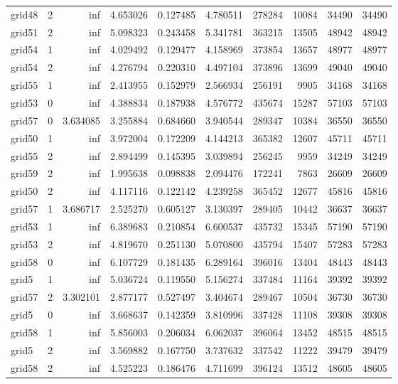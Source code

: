 \begin{longtable}{|l|r|r|r|r|r|r|r|r|r|}
grid48 & 2 & inf & 4.653026 & 0.127485 & 4.780511 & 278284 & 10084 & 34490 & 34490 \\
grid51 & 2 & inf & 5.098323 & 0.243458 & 5.341781 & 363215 & 13505 & 48942 & 48942 \\
grid54 & 1 & inf & 4.029492 & 0.129477 & 4.158969 & 373854 & 13657 & 48977 & 48977 \\
grid54 & 2 & inf & 4.276794 & 0.220310 & 4.497104 & 373896 & 13699 & 49040 & 49040 \\
grid55 & 1 & inf & 2.413955 & 0.152979 & 2.566934 & 256191 & 9905 & 34168 & 34168 \\
grid53 & 0 & inf & 4.388834 & 0.187938 & 4.576772 & 435674 & 15287 & 57103 & 57103 \\
grid57 & 0 & 3.634085 & 3.255884 & 0.684660 & 3.940544 & 289347 & 10384 & 36550 & 36550 \\
grid50 & 1 & inf & 3.972004 & 0.172209 & 4.144213 & 365382 & 12607 & 45711 & 45711 \\
grid55 & 2 & inf & 2.894499 & 0.145395 & 3.039894 & 256245 & 9959 & 34249 & 34249 \\
grid59 & 2 & inf & 1.995638 & 0.098838 & 2.094476 & 172241 & 7863 & 26609 & 26609 \\
grid50 & 2 & inf & 4.117116 & 0.122142 & 4.239258 & 365452 & 12677 & 45816 & 45816 \\
grid57 & 1 & 3.686717 & 2.525270 & 0.605127 & 3.130397 & 289405 & 10442 & 36637 & 36637 \\
grid53 & 1 & inf & 6.389683 & 0.210854 & 6.600537 & 435732 & 15345 & 57190 & 57190 \\
grid53 & 2 & inf & 4.819670 & 0.251130 & 5.070800 & 435794 & 15407 & 57283 & 57283 \\
grid58 & 0 & inf & 6.107729 & 0.181435 & 6.289164 & 396016 & 13404 & 48443 & 48443 \\
grid5 & 1 & inf & 5.036724 & 0.119550 & 5.156274 & 337484 & 11164 & 39392 & 39392 \\
grid57 & 2 & 3.302101 & 2.877177 & 0.527497 & 3.404674 & 289467 & 10504 & 36730 & 36730 \\
grid5 & 0 & inf & 3.668637 & 0.142359 & 3.810996 & 337428 & 11108 & 39308 & 39308 \\
grid58 & 1 & inf & 5.856003 & 0.206034 & 6.062037 & 396064 & 13452 & 48515 & 48515 \\
grid5 & 2 & inf & 3.569882 & 0.167750 & 3.737632 & 337542 & 11222 & 39479 & 39479 \\
grid58 & 2 & inf & 4.525223 & 0.186476 & 4.711699 & 396124 & 13512 & 48605 & 48605 \\

\end{longtable}
